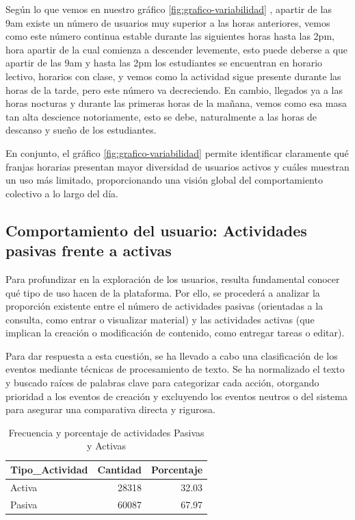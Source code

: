 \documentclass[notspecified,article,submit,moreauthors,pdftex]{Definitions/mdpi}
\begin{document}
Según lo que vemos en nuestro gráfico \ref{fig:grafico-variabilidad} ,
apartir de las 9am existe un número de usuarios muy superior a las horas
anteriores, vemos como este número continua estable durante las
siguientes horas hasta las 2pm, hora apartir de la cual comienza a
descender levemente, esto puede deberse a que apartir de las 9am y hasta
las 2pm los estudiantes se encuentran en horario lectivo, horarios con
clase, y vemos como la actividad sigue presente durante las horas de la
tarde, pero este número va decreciendo. En cambio, llegados ya a las
horas nocturas y durante las primeras horas de la mañana, vemos como esa
masa tan alta descience notoriamente, esto se debe, naturalmente a las
horas de descanso y sueño de los estudiantes.

En conjunto, el gráfico \ref{fig:grafico-variabilidad} permite
identificar claramente qué franjas horarias presentan mayor diversidad
de usuarios activos y cuáles muestran un uso más limitado,
proporcionando una visión global del comportamiento colectivo a lo largo
del día.

\subsection{Comportamiento del usuario: Actividades pasivas frente a
activas}\label{comportamiento-del-usuario-actividades-pasivas-frente-a-activas}

Para profundizar en la exploración de los usuarios, resulta fundamental
conocer qué tipo de uso hacen de la plataforma. Por ello, se procederá a
analizar la proporción existente entre el número de actividades pasivas
(orientadas a la consulta, como entrar o visualizar material) y las
actividades activas (que implican la creación o modificación de
contenido, como entregar tareas o editar).

Para dar respuesta a esta cuestión, se ha llevado a cabo una
clasificación de los eventos mediante técnicas de procesamiento de
texto. Se ha normalizado el texto y buscado raíces de palabras clave
para categorizar cada acción, otorgando prioridad a los eventos de
creación y excluyendo los eventos neutros o del sistema para asegurar
una comparativa directa y rigurosa.

\begin{longtable}[t]{lrr}
\caption{\label{tab:tabla-proporcion}Frecuencia y porcentaje de actividades Pasivas y Activas}\\
\toprule
Tipo\_Actividad & Cantidad & Porcentaje\\
\midrule
Activa & 28318 & 32.03\\
Pasiva & 60087 & 67.97\\
\bottomrule
\end{longtable}
\end{document}
